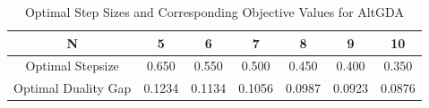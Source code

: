 \documentclass{article}
\begin{document}
        

\begin{table}[h!]
\centering
\begin{tabular}{|c|c|c|c|c|c|c|}
\hline
N & 5 & 6 & 7 & 8 & 9 & 10 \\  
\hline
Optimal Stepsize & 0.650 & 0.550 & 0.500 & 0.450 & 0.400 & 0.350 \\
\hline
Optimal Duality Gap & 0.1234 & 0.1134 & 0.1056 & 0.0987 & 0.0923 & 0.0876 \\
\end{tabular}
\caption{Optimal Step Sizes and Corresponding Objective Values for AltGDA}
\label{table:altgda_results}
\end{table}
\end{document}
